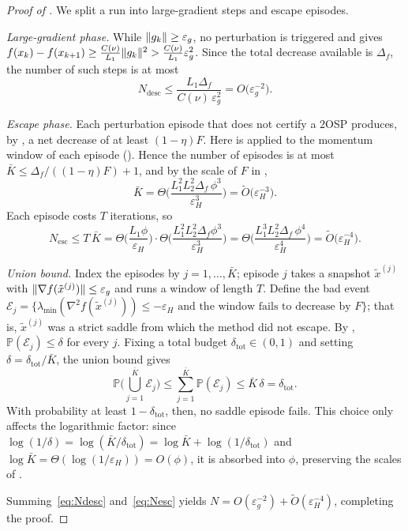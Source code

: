\documentclass[11pt]{article}
\theoremstyle{plain}
\theoremstyle{definition}
\theoremstyle{remark}
\DeclarePairedDelimiter{\norm}{\lVert}{\rVert}
\newcommand{\Prob}{\mathbb{P}}
\newcommand{\lmin}{\lambda_{\min}}
\newcommand{\grad}{\nabla}
\newcommand{\Hess}{\nabla^2}
\newcommand{\eps}{\varepsilon}
\newcommand{\epsg}{\eps_{g}}
\newcommand{\epsH}{\eps_{H}}
\newcommand{\xt}{\tilde{x}}
\newcommand{\Otil}{\widetilde{O}}
\begin{document}
\begin{proof}[Proof of ]
We split a run into large-gradient steps and escape episodes.
 
\emph{Large-gradient phase.} While $\norm{g_{k}}\ge\epsg$, no
perturbation is triggered and  gives
$f(x_{k})-f(x_{k+1})\ge\tfrac{C(\nu)}{L_{1}}\norm{g_{k}}^{2}
>\tfrac{C(\nu)}{L_{1}}\epsg^{2}$. Since the total decrease available is
$\Delta_{f}$, the number of such steps is at most
\begin{equation}\label{eq:Ndesc}
  N_{\mathrm{desc}}\le\frac{L_{1}\Delta_{f}}{C(\nu)\,\epsg^{2}}
  =O\!\big(\epsg^{-2}\big).
\end{equation}
 
\emph{Escape phase.} Each perturbation episode that does not certify a
$2$OSP produces, by , a net decrease of at least
$(1-\eta)F$. Here  is applied to the momentum window of each episode
(). Hence the number of episodes is at most
$\bar K\le\Delta_{f}/((1-\eta)F)+1$, and by the scale of $F$ in
,
\[
  \bar K=\Theta\!\Big(\frac{L_{1}^{2}L_{2}^{2}\Delta_{f}\,\phi^{3}}{\epsH^{3}}\Big)
  =\Otil\!\big(\epsH^{-3}\big).
\]
Each episode costs $T$ iterations, so
\begin{equation}\label{eq:Nesc}
  N_{\mathrm{esc}}\le T\,\bar K
  =\Theta\!\Big(\frac{L_{1}\phi}{\epsH}\Big)
  \cdot\Theta\!\Big(\frac{L_{1}^{2}L_{2}^{2}\Delta_{f}\phi^{3}}{\epsH^{3}}\Big)
  =\Theta\!\Big(\frac{L_{1}^{3}L_{2}^{2}\Delta_{f}\,\phi^{4}}{\epsH^{4}}\Big)
  =\Otil\!\big(\epsH^{-4}\big).
\end{equation}
 
\emph{Union bound.} Index the episodes by $j=1,\dots,\bar K$; episode
$j$ takes a snapshot $\xt^{(j)}$ with $\norm{\grad f(\xt^{(j)})}\le\epsg$
and runs a window of length $T$. Define the bad event
$\mathcal{E}_{j}=\{\lmin(\Hess f(\xt^{(j)}))\le-\epsH
\text{ and the window fails to decrease by }F\}$; that is, $\xt^{(j)}$
was a strict saddle from which the method did not escape. By
, $\Prob(\mathcal{E}_{j})\le\delta$ for every $j$.
Fixing a total budget $\delta_{\mathrm{tot}}\in(0,1)$ and setting
$\delta=\delta_{\mathrm{tot}}/\bar K$, the union bound gives
\[
  \Prob\Big(\textstyle\bigcup_{j=1}^{\bar K}\mathcal{E}_{j}\Big)
  \le\sum_{j=1}^{\bar K}\Prob(\mathcal{E}_{j})
  \le\bar K\,\delta=\delta_{\mathrm{tot}}.
\]
With probability at least $1-\delta_{\mathrm{tot}}$, then, no saddle
episode fails. This choice only affects the logarithmic factor: since
$\log(1/\delta)=\log(\bar K/\delta_{\mathrm{tot}})
=\log\bar K+\log(1/\delta_{\mathrm{tot}})$ and
$\log\bar K=\Theta(\log(1/\epsH))=O(\phi)$, it is absorbed into $\phi$,
preserving the scales of .
 
Summing~\eqref{eq:Ndesc} and~\eqref{eq:Nesc} yields
$N=O(\epsg^{-2})+\Otil(\epsH^{-4})$, completing the proof.
\end{proof}
 
\end{document}
